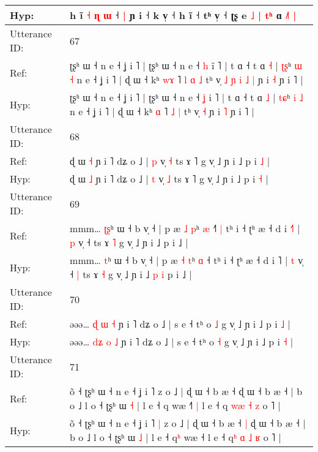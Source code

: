 \documentclass[10pt]{article}
\DeclareRobustCommand{\hl}[1]{{\textcolor{red}{#1}}}
\begin{document}
\begin{longtable}{ll}
Hyp: & h ĩ\hl{ }\hl{˧}\hl{ }\hl{ɳ}\hl{ }\hl{ɯ} ˧\hl{ }\hl{|} ɲ i ˧ k v̩ ˧ h ĩ ˧ tʰ v̩ ˧\hl{}\hl{} ʈʂ e\hl{ }\hl{˩} \hl{|} \hl{t}\hl{ʰ} ɑ \hl{˩}˥\hl{ }\hl{|}
 \\
\midrule
Utterance ID: & 67 \\
Ref: & ʈʂʰ ɯ ˧ n e ˧ ʝ i ˥ | ʈʂʰ ɯ ˧ n e ˧ \hl{h} i\hl{̃} ˥ | t ɑ ˧ t ɑ \hl{˧} | \hl{ʈ}\hl{ʂ}ʰ \hl{ɯ} \hl{˧} n e ˧ ʝ i ˥ | ɖ ɯ ˧ kʰ \hl{w}\hl{ɤ} ˥\hl{ }\hl{l} \hl{ɑ} \hl{˩} tʰ v̩\hl{ }\hl{˩}\hl{ }\hl{ɲ}\hl{ }\hl{i}\hl{ }\hl{˩} \hl{|} ɲ i \hl{˧} ɲ i ˥ |
 \\
Hyp: & ʈʂʰ ɯ ˧ n e ˧ ʝ i ˥ | ʈʂʰ ɯ ˧ n e ˧ \hl{ʝ} i\hl{} ˥ | t ɑ ˧ t ɑ \hl{˩} | \hl{t}\hl{ɕ}ʰ \hl{i} \hl{˩} n e ˧ ʝ i ˥ | ɖ ɯ ˧ kʰ \hl{}\hl{ɑ} ˥\hl{}\hl{} \hl{˩} \hl{|} tʰ v̩\hl{}\hl{}\hl{}\hl{}\hl{}\hl{}\hl{}\hl{} \hl{˧} ɲ i \hl{˥} ɲ i ˥ |
 \\
\midrule
Utterance ID: & 68 \\
Ref: & ɖ ɯ \hl{˧} ɲ i ˥ dʑ o ˩ | \hl{p} v̩ \hl{˧} ts ɤ ˥ g v̩ ˩ ɲ i ˩ p i \hl{˩} |
 \\
Hyp: & ɖ ɯ \hl{˩} ɲ i ˥ dʑ o ˩ | \hl{t} v̩ \hl{˩} ts ɤ ˥ g v̩ ˩ ɲ i ˩ p i \hl{˧} |
 \\
\midrule
Utterance ID: & 69 \\
Ref: & mmm… \hl{ʈ}\hl{ʂ}ʰ ɯ ˧ b v̩ ˧ | p æ \hl{˩} \hl{p}ʰ \hl{æ} ˧\hl{˥}\hl{ }\hl{|} tʰ i ˧ ʈʰ æ ˧ d i \hl{˧}˥ | \hl{p} v̩ ˧\hl{}\hl{} ts ɤ \hl{˥} g v̩ ˩ ɲ i ˩\hl{}\hl{}\hl{}\hl{} p i ˩ |
 \\
Hyp: & mmm… \hl{}\hl{t}ʰ ɯ ˧ b v̩ ˧ | p æ \hl{˧} \hl{t}ʰ \hl{ɑ} ˧\hl{}\hl{}\hl{} tʰ i ˧ ʈʰ æ ˧ d i \hl{}˥ | \hl{t} v̩ ˧\hl{ }\hl{|} ts ɤ \hl{˧} g v̩ ˩ ɲ i ˩\hl{ }\hl{p}\hl{ }\hl{i} p i ˩ |
 \\
\midrule
Utterance ID: & 70 \\
Ref: & əəə… \hl{}\hl{ɖ} \hl{ɯ} \hl{˧} ɲ i ˥ dʑ o ˩ | s e ˧ tʰ o \hl{˩} g v̩ ˩ ɲ i ˩ p i \hl{˩} |
 \\
Hyp: & əəə… \hl{d}\hl{ʑ} \hl{o} \hl{˩} ɲ i ˥ dʑ o ˩ | s e ˧ tʰ o \hl{˧} g v̩ ˩ ɲ i ˩ p i \hl{˧} |
 \\
\midrule
Utterance ID: & 71 \\
Ref: & õ ˧ ʈʂʰ ɯ ˧ n e ˧ ʝ i ˥\hl{}\hl{} z o ˩ | ɖ ɯ ˧ b æ ˧\hl{}\hl{} ɖ ɯ ˧ b æ ˧ | b o ˩ l o ˧ ʈʂʰ ɯ \hl{˧} | l e ˧ q\hl{} wæ ˧\hl{˥}\hl{ }\hl{|} l e ˧ q\hl{ }\hl{w}\hl{æ} \hl{˧} \hl{z} o ˥ |
 \\
Hyp: & õ ˧ ʈʂʰ ɯ ˧ n e ˧ ʝ i ˥\hl{ }\hl{|} z o ˩ | ɖ ɯ ˧ b æ ˧\hl{ }\hl{|} ɖ ɯ ˧ b æ ˧ | b o ˩ l o ˧ ʈʂʰ ɯ \hl{˩} | l e ˧ q\hl{ʰ} wæ ˧\hl{}\hl{}\hl{} l e ˧ q\hl{ʰ}\hl{ }\hl{ɑ} \hl{˩} \hl{ʁ} o ˥ |
 \\

\end{longtable}
\end{document}
